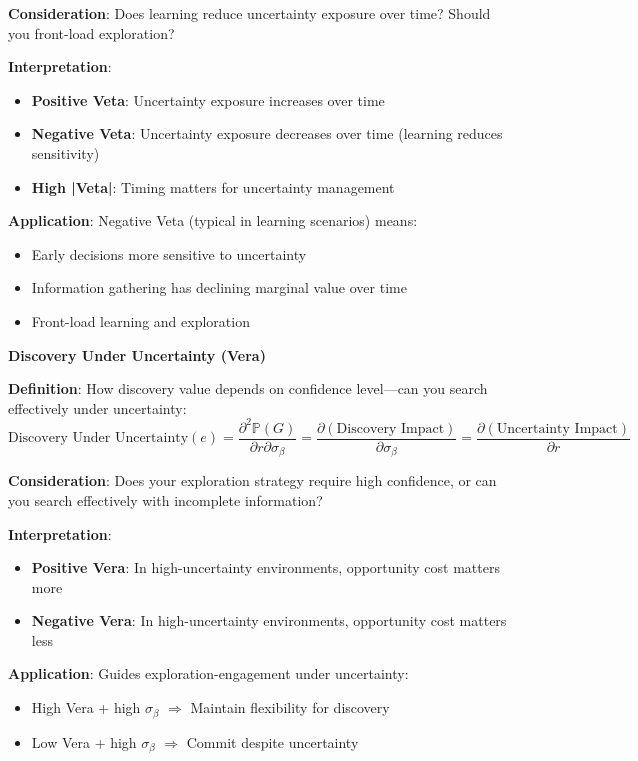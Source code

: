 \textbf{Consideration}: Does learning reduce uncertainty exposure over time? Should you front-load exploration?

\textbf{Interpretation}:
\begin{itemize}
\item \textbf{Positive Veta}: Uncertainty exposure increases over time
\item \textbf{Negative Veta}: Uncertainty exposure decreases over time (learning reduces sensitivity)
\item \textbf{High |Veta|}: Timing matters for uncertainty management
\end{itemize}

\textbf{Application}: Negative Veta (typical in learning scenarios) means:
\begin{itemize}
\item Early decisions more sensitive to uncertainty
\item Information gathering has declining marginal value over time
\item Front-load learning and exploration
\end{itemize}

\textbf{Discovery Under Uncertainty (Vera)}

\textbf{Definition}: How discovery value depends on confidence level---can you search effectively under uncertainty:
\[ \text{Discovery Under Uncertainty}(e) = \frac{\partial^2 \mathbb{P}(G)}{\partial r \partial \sigma_\beta} = \frac{\partial (\text{Discovery Impact})}{\partial \sigma_\beta} = \frac{\partial (\text{Uncertainty Impact})}{\partial r} \]

\textbf{Consideration}: Does your exploration strategy require high confidence, or can you search effectively with incomplete information?

\textbf{Interpretation}:
\begin{itemize}
\item \textbf{Positive Vera}: In high-uncertainty environments, opportunity cost matters more
\item \textbf{Negative Vera}: In high-uncertainty environments, opportunity cost matters less
\end{itemize}

\textbf{Application}: Guides exploration-engagement under uncertainty:
\begin{itemize}
\item High Vera + high $\sigma_\beta$ $\Rightarrow$ Maintain flexibility for discovery
\item Low Vera + high $\sigma_\beta$ $\Rightarrow$ Commit despite uncertainty
\end{itemize}

